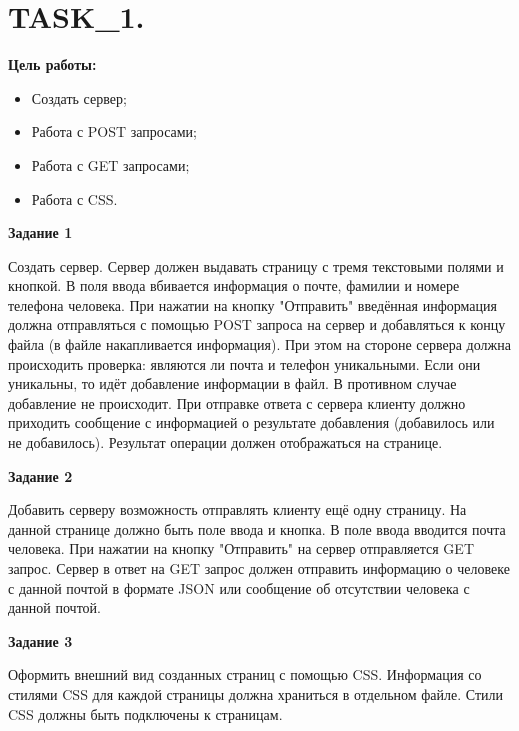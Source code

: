 \chapter{TASK\_1.}

\textbf{Цель работы:}

\begin{itemize} 
	\item Создать сервер;
	\item Работа с POST запросами;
	\item Работа с GET запросами;
	\item Работа с CSS.
\end{itemize}

\textbf{Задание 1}

Создать сервер. Сервер должен выдавать страницу с тремя текстовыми полями и кнопкой. В поля ввода вбивается информация о почте, фамилии и номере телефона человека. При нажатии на кнопку "Отправить" введённая информация должна отправляться с помощью POST запроса на сервер и добавляться к концу файла (в файле накапливается информация). При этом на стороне сервера должна происходить проверка: являются ли почта и телефон уникальными. Если они уникальны, то идёт добавление информации в файл. В противном случае добавление не происходит. При отправке ответа с сервера клиенту должно приходить сообщение с информацией о результате добавления (добавилось или не добавилось). Результат операции должен отображаться на странице.

\textbf{Задание 2}

Добавить серверу возможность отправлять клиенту ещё одну страницу. На данной странице должно быть поле ввода и кнопка. В поле ввода вводится почта человека. При нажатии на кнопку "Отправить" на сервер отправляется GET запрос. Сервер в ответ на GET запрос должен отправить информацию о человеке с данной почтой в формате JSON или сообщение об отсутствии человека с данной почтой.

\textbf{Задание 3}

Оформить внешний вид созданных страниц с помощью CSS. Информация со стилями CSS для каждой страницы должна храниться в отдельном файле. Стили CSS должны быть подключены к страницам.

